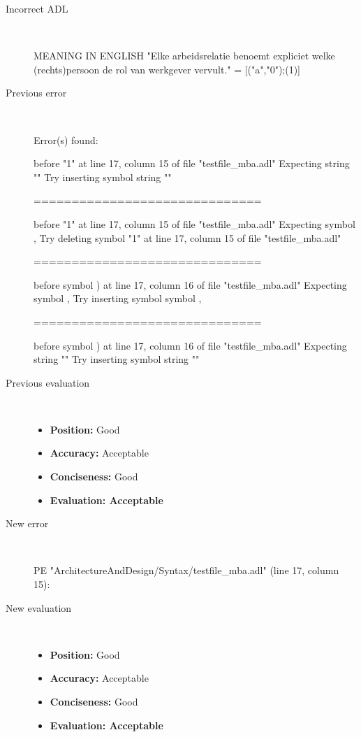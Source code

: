 \begin{description}
  \item[Incorrect ADL]~\\
\begin{adl}
MEANING IN ENGLISH "Elke arbeidsrelatie benoemt expliciet welke (rechts)persoon de rol van werkgever vervult."
= [("a","0");(1)] \end{adl}
  \item[Previous error]~\\
\begin{haskell}
Error(s) found:

before "1" at line 17, column 15 of file "testfile_mba.adl"
Expecting string ""
Try inserting symbol string ""

==============================

before "1" at line 17, column 15 of file "testfile_mba.adl"
Expecting symbol ,
Try deleting symbol "1" at line 17, column 15 of file "testfile_mba.adl"

==============================

before symbol ) at line 17, column 16 of file "testfile_mba.adl"
Expecting symbol ,
Try inserting symbol symbol ,

==============================

before symbol ) at line 17, column 16 of file "testfile_mba.adl"
Expecting string ""
Try inserting symbol string ""
\end{haskell}
  \item[Previous evaluation]~\\
    \begin{itemize}
    \item \textbf{Position:} Good
    \item \textbf{Accuracy:} Acceptable
    \item \textbf{Conciseness:} Good
    \item \textbf{Evaluation: Acceptable}
    \end{itemize}
  \item[New error]~\\
\begin{haskell}
PE "ArchitectureAndDesign/Syntax/testfile_mba.adl" (line 17, column 15):\end{haskell}
  \item[New evaluation]~\\
    \begin{itemize}
    \item \textbf{Position:} Good
    \item \textbf{Accuracy:} Acceptable
    \item \textbf{Conciseness:} Good
    \item \textbf{Evaluation: Acceptable}
    \end{itemize}
  \end{description}

